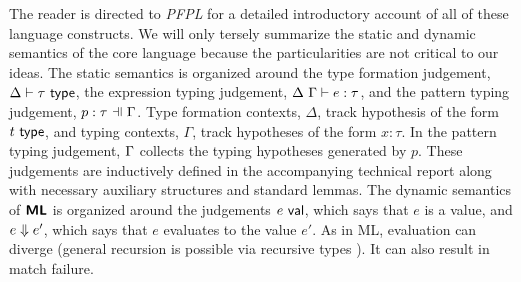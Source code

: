 \documentclass[acmsmall,screen]{acmart}
\begin{document}
 The reader is directed to \emph{PFPL} \cite{pfple1} for a detailed introductory account of all of these language constructs. We will only tersely summarize the static and dynamic semantics of the core language because the particularities are not critical to our ideas. The static semantics is organized around the type formation judgement, $\Delta \vdash \tau~\mathsf{type}$, the expression typing judgement, $\Delta~\Gamma \vdash e : \tau$, and the pattern typing judgement, $\patType{\pctx}{p}{\tau}$. Type formation contexts, $\Delta$, track hypothesis of the form $t~\mathsf{type}$, and typing contexts, $\Gamma$, track hypotheses of the form $x : \tau$. In the pattern typing judgement, $\Gamma$ collects the typing hypotheses generated by $p$. These judgements are inductively defined in the accompanying technical report along with necessary auxiliary structures and standard lemmas. The dynamic semantics of $\textsf{\textbf{ML}}$ is organized around the judgements $e~\mathsf{val}$, which says that $e$ is a value, and $e \Downarrow e'$, which says that $e$ evaluates to the value $e'$. As in ML, evaluation can diverge (general recursion is possible via recursive types \cite{pfple1}). It can also result in match failure.%
\end{document}
